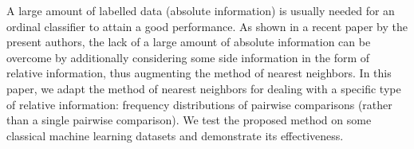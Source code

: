 
A large amount of labelled data (absolute information) is usually needed for an ordinal classifier to attain a good performance. As shown in a recent paper by the present authors, the lack of a large amount of absolute information can be overcome by additionally considering some side information in the form of relative information, thus augmenting the method of nearest neighbors. In this paper, we adapt the method of nearest neighbors for dealing with a specific type of relative information: frequency distributions of pairwise comparisons (rather than a single pairwise comparison). We test the proposed method on some classical machine learning datasets and demonstrate its effectiveness.



